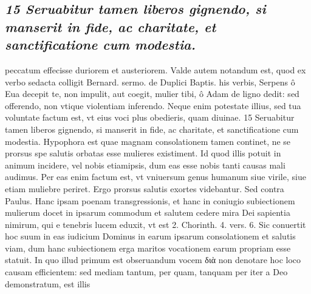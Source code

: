 \documentclass{article}
\begin{document}
\begin{pages}
\subsection*{\textit{15 Seruabitur tamen liberos gignendo, si manserit in fide, ac charitate, et sanctificatione cum modestia.}}peccatum effecisse duriorem et austeriorem. Valde autem notandum est, quod ex verbo sedacta colligit Bernard. sermo. de Duplici Baptis. his verbis, Serpens ô Eua decepit te, non impulit, aut coegit, mulier tibi, ô Adam de ligno dedit: sed offerendo, non vtique violentiam inferendo. Neque enim potestate illius, sed tua voluntate factum est, vt eius voci plus obedieris, quam diuinae. 15 Seruabitur tamen liberos gignendo, si manserit in fide, ac charitate, et sanctificatione cum modestia. Hypophora est quae magnam consolationem tamen continet, ne se prorsus spe salutis orbatas esse mulieres existiment. Id quod illis potuit in animum incidere, vel nobis etiamipsis, dum eas esse nobis tanti causas mali audimus. Per eas enim factum est, vt vniuersum genus humanum siue virile, siue etiam muliebre periret. Ergo prorsus salutis exortes videbantur. Sed contra Paulus. Hanc ipsam poenam transgressionis, et hanc in coniugio subiectionem mulierum docet in ipsarum commodum et salutem cedere mira Dei sapientia nimirum, qui e tenebris lucem eduxit, vt est 2. Chorinth. 4. vers. 6. Sic conuertit hoc suum in eas iudicium Dominus in earum ipsarum consolationem et salutis viam, dum hanc subiectionem erga maritos vocationem earum propriam esse statuit. In quo illud primum est obseruandum vocem διὰ non denotare hoc loco causam efficientem: sed mediam tantum, per quam, tanquam per iter a Deo demonstratum, est illis  \pend

\end{pages}
\end{document}
